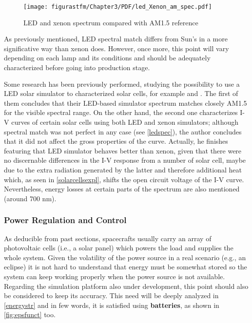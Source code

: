 			\begin{figure} [H] 				
				\centering
				\texttt{[image: figurastfm/Chapter3/PDF/led\_Xenon\_am\_spec.pdf]}
				\caption{\acrshort{LED} and xenon spectrum compared with \acrshort{AM}1.5 reference \cite{xenonled}} \label{ledspec}
							\vspace{-2cm}

			\end{figure}
			
			
			As previously mentioned, \acrshort{LED} spectral match differs from Sun's in a more significative way than xenon does. However, once more, this point will vary depending on each lamp and its conditions and should be adequately characterized before going into production stage. 
			
			Some research has been previously performed, studying the possibility to use a \acrshort{LED} solar simulator to characterized solar cells, for example \cite{indios} and \cite{xenonled}. The first of them concludes that their \acrshort{LED}-based simulator spectrum matches closely \acrshort{AM}1.5 for the visible spectral range. On the other hand, the second one characterizes I-V curves of certain solar cells using both \acrshort{LED} and xenon simulators; although spectral match was not perfect in any case (see \autoref{ledspec}), the author concludes that it did not affect the gross properties of the curve. Actually, he finishes featuring that \acrshort{LED} simulator behaves better than xenon, given that there were no discernable differences in the I-V response from a number of solar cell, maybe due to the extra radiation generated by the latter and therefore additional heat which, as seen in \ref{solarcellsexpl}, shifts the open circuit voltage of the I-V curve. Nevertheless, energy losses at certain parts of the spectrum are also mentioned (around 700 nm).


\subsubsection{Power Regulation and Control}

As deducible from past sections, spacecrafts usually carry an array of photovoltaic cells (i.e., a solar panel) which powers the load and supplies the whole system. Given the volatility of the power source in a real scenario (e.g., an eclipse) it is not hard to understand that energy must be somewhat stored so the system can keep working properly when the power source is not available. Regarding the simulation platform also under development, this point should also be considered to keep its accuracy. This need will be deeply analyzed in \ref{energystr} and in few words, it is satisfied using \textbf{batteries}, as shown in \autoref{fig:epsfunct} too.  

